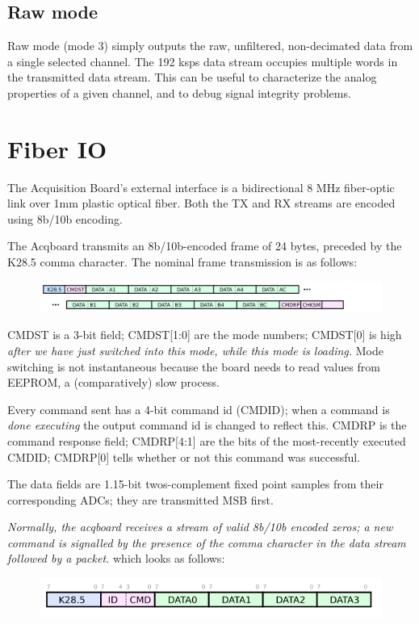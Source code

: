 \subsection{Raw mode}
Raw mode (mode 3) simply outputs the raw, unfiltered, non-decimated
data from a single selected channel. The 192 ksps data stream occupies
multiple words in the transmitted data stream. This can be useful to
characterize the analog properties of a given channel, and to debug
signal integrity problems.


\section{Fiber IO}
The Acquisition Board's external interface is a bidirectional 8 MHz
fiber-optic link over  1mm plastic optical fiber. Both the TX
and RX streams are encoded using 8b/10b encoding.

The Acqboard transmits an 8b/10b-encoded frame of 24 bytes, preceded
by the K28.5 comma character. The nominal frame transmission is as
follows:

\begin{figure}[h!]
\includegraphics[scale=1.0]{txpacket.svg}
\end{figure}

CMDST is a 3-bit field; CMDST[1:0] are the mode numbers; CMDST[0] is
high \textit{after we have just switched into this mode, while this
  mode is loading.} Mode switching is not instantaneous because the
board needs to read values from EEPROM, a (comparatively) slow
process.


Every command sent has a 4-bit command id (CMDID); when a command is
\textit{done executing} the output command id is changed to reflect
this. CMDRP is the command response field; CMDRP[4:1] are the bits of
the most-recently executed CMDID; CMDRP[0] tells whether or not this
command was successful.

The data fields are 1.15-bit twos-complement fixed point samples from
their corresponding ADCs; they are transmitted MSB first.

\emph{Normally, the acqboard receives a stream of valid 8b/10b encoded
  zeros; a new command is signalled by the presence of the comma
  character in the data stream followed by a packet. } which looks as follows:

\begin{figure}[h!]
\includegraphics[scale=1.0]{rxpacket.svg}
\end{figure}

